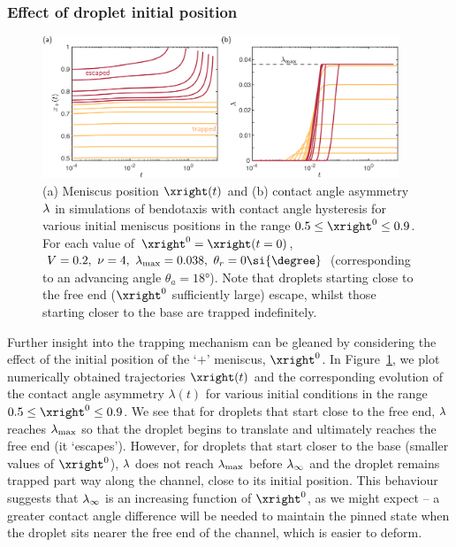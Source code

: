 \subsubsection{Effect of droplet initial position}
\begin{figure}[t]
\includegraphics[width = 0.95\textwidth]{escape_traces}
\caption{(a) Meniscus position $\xright(t)$ and (b) contact angle asymmetry $\lambda$ in simulations of bendotaxis with contact angle hysteresis
for various initial meniscus positions in the range $0.5\leq \xright^0 \leq0.9$.  For each value of $\xright^0 = \xright(t = 0)$, $V = 0.2,~ \nu = 4,~ \hyspar_{\text{max}} = 0.038, ~\theta_r = 0\si{\degree}$ (corresponding to an advancing angle $\theta_a = 18\si{\degree}$). Note that droplets starting close to the free end ($\xright^0$ sufficiently large) escape, whilst those starting closer to the base are trapped indefinitely.}\label{fig:Ch4:Hysteresis:Numerics:initialpos}
\end{figure}

Further insight into the trapping mechanism can be gleaned by considering the effect of the initial position of the `$+$' meniscus, $\xright^0$. In Figure~\ref{fig:Ch4:Hysteresis:Numerics:initialpos}, we plot numerically obtained trajectories $\xright(t)$ and the corresponding evolution of the contact angle asymmetry $\lambda(t)$ for various initial conditions in the range $0.5 \leq \xright^0 \leq 0.9$. We see that for droplets that start close to the free end, $\lambda$ reaches $\lambda_{\text{max}}$ so that the droplet begins to translate and ultimately reaches the free end (it `escapes'). However, for droplets that start closer to the base (smaller values of $\xright^0$), $\lambda$ does not reach $\lambda_{\text{max}}$ before $\lambda_{\infty}$ and the droplet remains trapped part way along the channel, close to its initial position. This behaviour suggests that $\lambda_{\infty}$ is an increasing function of $\xright^0$, as we might expect -- a greater contact angle difference will be needed to maintain the pinned state when the droplet sits nearer the free end of the channel, which is easier to deform.

